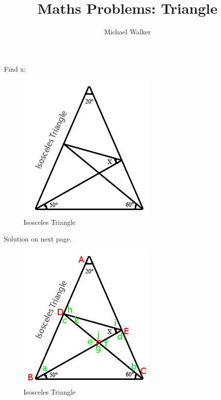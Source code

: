 \documentclass[10pt,a4paper,oneside]{article}
\author{Michael Walker}
\title{Maths Problems: Triangle}
\begin{document}
\maketitle{}

Find x:

\begin{figure}[here]
  \begin{center}
    \includegraphics[scale=0.6]{problem.png}
    \caption{Isosceles Triangle}
    \label{fig:problem}
  \end{center}
\end{figure}

Solution on next page.

\pagebreak

\begin{figure}[here]
  \begin{center}
    \includegraphics[scale=0.6]{solution.png}
    \caption{Isosceles Triangle}
    \label{fig:solution}
  \end{center}
\end{figure}
\end{document}
